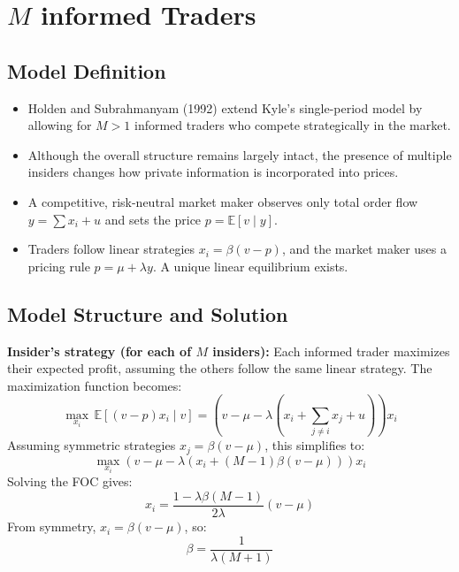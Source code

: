 \documentclass{beamer}
\begin{document}
\section{$M$ informed Traders}
\subsection{Model Definition}
\begin{frame}
\begin{itemize}
    \item Holden and Subrahmanyam (1992) extend Kyle’s single-period model by allowing for \( M > 1 \) informed traders who compete strategically in the market.

    \item Although the overall structure remains largely intact, the presence of multiple insiders changes how private information is incorporated into prices.

    \item A competitive, risk-neutral market maker observes only total order flow \( y = \sum x_i + u \) and sets the price \( p = \mathbb{E}[v \mid y] \).

    \item Traders follow linear strategies \( x_i = \beta(v - p) \), and the market maker uses a pricing rule \( p = \mu + \lambda y \). A unique linear equilibrium exists.
\end{itemize}
\end{frame}

\subsection{Model Structure and Solution}
\begin{frame}
\begin{block}{\tiny \textbf{Insider’s strategy (for each of \( M \) insiders):}}
\tiny
Each informed trader maximizes their expected profit, assuming the others follow the same linear strategy. The maximization function becomes:
\[
\max_{x_i} \, \mathbb{E}[(v - p)x_i \mid v] = (v - \mu - \lambda(x_i + \sum_{j \neq i} x_j + u))x_i
\]
Assuming symmetric strategies \( x_j = \beta(v - \mu) \), this simplifies to:
\[
\max_{x_i} (v - \mu - \lambda(x_i + (M - 1)\beta(v - \mu)))x_i
\]
Solving the FOC gives:
\[
x_i = \frac{1 - \lambda \beta(M - 1)}{2\lambda}(v - \mu)
\]
From symmetry, \( x_i = \beta(v - \mu) \), so:
\[
\beta = \frac{1}{\lambda(M + 1)}
\]
\end{block}
\end{frame}
\end{document}
